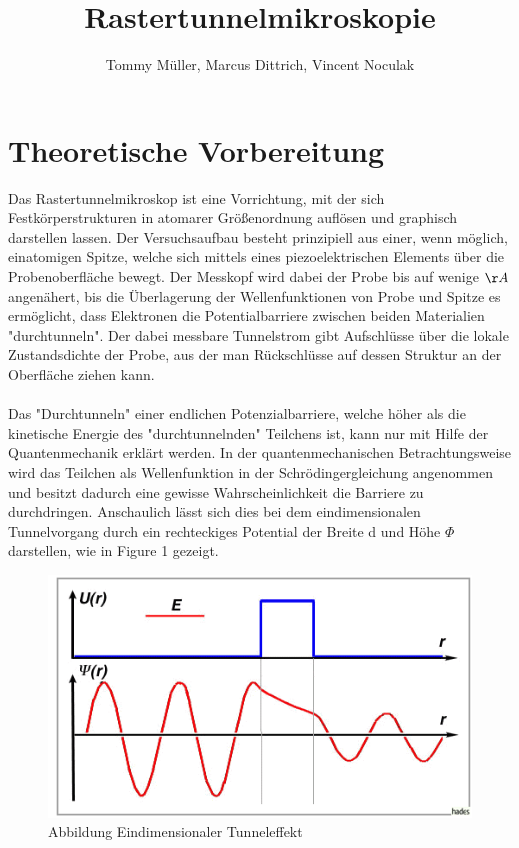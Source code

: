 \documentclass[10pt,a4paper]{article}
\author{Tommy Müller, Marcus Dittrich, Vincent Noculak}
\title{Rastertunnelmikroskopie}
\begin{document}
\maketitle
\newpage
\tableofcontents
\newpage

	\section{ Theoretische Vorbereitung}
	
	Das Rastertunnelmikroskop ist eine Vorrichtung, mit der sich Festkörperstrukturen in atomarer Größenordnung auflösen und graphisch darstellen lassen. Der Versuchsaufbau besteht prinzipiell aus einer, wenn möglich, einatomigen Spitze, welche sich mittels eines piezoelektrischen Elements über die Probenoberfläche bewegt. Der Messkopf wird dabei der Probe bis auf wenige $\AA$ angenähert, bis die Überlagerung der Wellenfunktionen von Probe und Spitze es ermöglicht, dass Elektronen die Potentialbarriere zwischen beiden Materialien "durchtunneln". Der dabei messbare Tunnelstrom gibt Aufschlüsse über die lokale Zustandsdichte der Probe, aus der man Rückschlüsse auf dessen Struktur an der Oberfläche ziehen kann. \\ \\Das "Durchtunneln" einer endlichen Potenzialbarriere, welche höher als die kinetische Energie des "durchtunnelnden" Teilchens ist, kann nur mit Hilfe der Quantenmechanik erklärt werden. In der quantenmechanischen Betrachtungsweise wird das Teilchen als Wellenfunktion in der Schrödingergleichung angenommen und besitzt dadurch eine gewisse Wahrscheinlichkeit die Barriere zu durchdringen. Anschaulich lässt sich dies bei dem eindimensionalen Tunnelvorgang durch ein rechteckiges Potential der Breite d und Höhe $\Phi$ darstellen, wie in Figure 1 gezeigt.
	\begin{figure}[h]
		\includegraphics[scale = 0.8]{tunnel.png}
		\centering
		\caption{Abbildung Eindimensionaler Tunneleffekt}
		\label{diagramm_aufspaltung}
	\end{figure}
\end{document}
